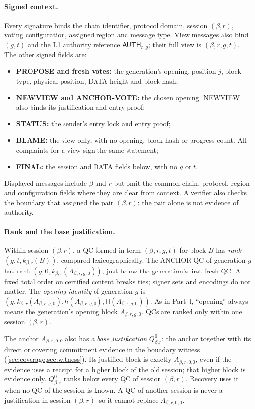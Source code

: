 \documentclass[11pt,a4paper]{article}
\newcommand{\Hash}{\mathsf H}
\newcommand{\tagg}[1]{\ensuremath{\mathsf{#1}}}
\newcommand{\defterm}[1]{\textcolor{rrBlue}{\textit{#1}}}
\newcounter{protocol}
\begin{document}
\paragraph{Signed context.}
Every signature binds the chain identifier, protocol domain, session
$(\beta,r)$, voting configuration, assigned region and message type.
View messages also bind $(g,t)$ and the L1 authority reference
$\tagg{AUTH}_{r,g}$; their full view is $(\beta,r,g,t)$. The other
signed fields are:
\begin{itemize}
\item \textbf{PROPOSE and fresh votes:} the generation's opening,
position $j$, block type, physical position, DATA height and block hash;
\item \textbf{NEWVIEW and ANCHOR-VOTE:} the chosen opening. NEWVIEW
also binds its justification and entry proof;
\item \textbf{STATUS:} the sender's entry lock and entry proof;
\item \textbf{BLAME:} the view only, with no opening, block hash or
progress count. All complaints for a view sign the same statement;
\item \textbf{FINAL:} the session and DATA fields below, with no $g$ or $t$.
\end{itemize}
Displayed messages include $\beta$ and $r$ but omit the common chain,
protocol, region and configuration fields where they are clear from
context. A verifier also checks the boundary that assigned the pair
$(\beta,r)$; the pair alone is not evidence of authority.

\paragraph{Rank and the base justification.}
Within session $(\beta,r)$, a QC formed in term $(\beta,r,g,t)$ for block
$B$ has \defterm{rank} $(g,t,k_{\beta,r}(B))$, compared lexicographically.
The ANCHOR QC of generation $g$ has rank $(g,0,k_{\beta,r}(A_{\beta,r,g,0}))$,
just below the generation's first fresh QC. A fixed total order on
certified content breaks ties; signer sets and encodings do not matter.
The \defterm{opening identity} of generation $g$ is
$(g,k_{\beta,r}(A_{\beta,r,g,0}),h(A_{\beta,r,g,0}),\Hash(A_{\beta,r,g,0}))$.
As in Part~I, ``opening'' always means the generation's opening block
$A_{\beta,r,g,0}$. QCs are ranked only within one session $(\beta,r)$.

The anchor $A_{\beta,r,0,0}$ also has a \defterm{base justification}
$Q_{\beta,r}^0$: the anchor together with its direct or covering
commitment evidence in the boundary witness
(\cref{sec:coverage,sec:witness}). Its justified block is exactly
$A_{\beta,r,0,0}$, even if the evidence uses a receipt for a higher
block of the old session; that higher block is evidence only.
$Q_{\beta,r}^0$ ranks below every QC of session $(\beta,r)$. Recovery
uses it when no QC of the session is known. A QC of another session is
never a justification in session $(\beta,r)$, so it cannot replace
$A_{\beta,r,0,0}$.
\end{document}
